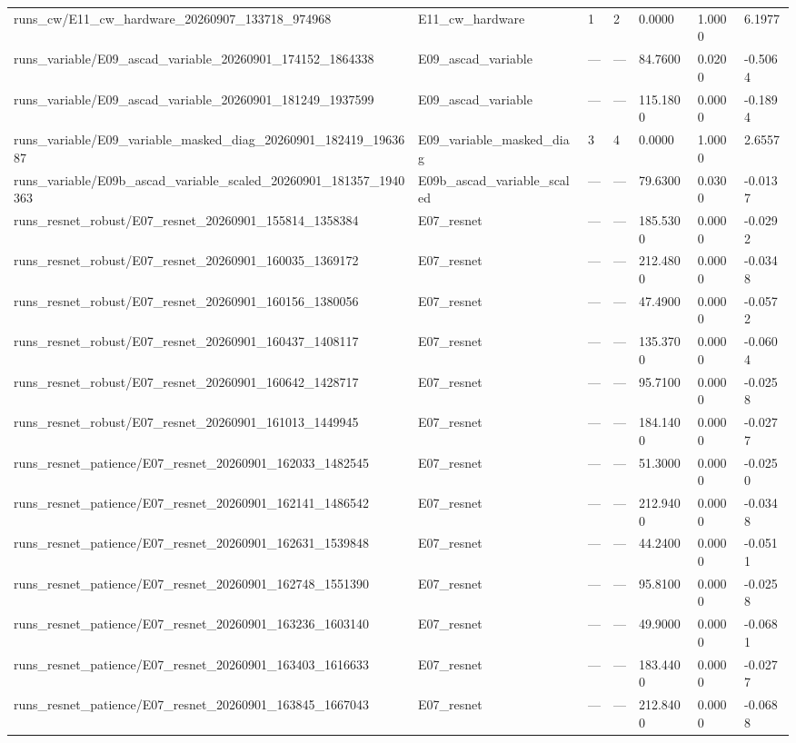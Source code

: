 \begin{tabular}{lllllll}
runs_cw/E11_cw_hardware_20260907_133718_974968 & E11_cw_hardware & 1 & 2 & 0.0000 & 1.0000 & 6.1977 \\
runs_variable/E09_ascad_variable_20260901_174152_1864338 & E09_ascad_variable & — & — & 84.7600 & 0.0200 & -0.5064 \\
runs_variable/E09_ascad_variable_20260901_181249_1937599 & E09_ascad_variable & — & — & 115.1800 & 0.0000 & -0.1894 \\
runs_variable/E09_variable_masked_diag_20260901_182419_1963687 & E09_variable_masked_diag & 3 & 4 & 0.0000 & 1.0000 & 2.6557 \\
runs_variable/E09b_ascad_variable_scaled_20260901_181357_1940363 & E09b_ascad_variable_scaled & — & — & 79.6300 & 0.0300 & -0.0137 \\
runs_resnet_robust/E07_resnet_20260901_155814_1358384 & E07_resnet & — & — & 185.5300 & 0.0000 & -0.0292 \\
runs_resnet_robust/E07_resnet_20260901_160035_1369172 & E07_resnet & — & — & 212.4800 & 0.0000 & -0.0348 \\
runs_resnet_robust/E07_resnet_20260901_160156_1380056 & E07_resnet & — & — & 47.4900 & 0.0000 & -0.0572 \\
runs_resnet_robust/E07_resnet_20260901_160437_1408117 & E07_resnet & — & — & 135.3700 & 0.0000 & -0.0604 \\
runs_resnet_robust/E07_resnet_20260901_160642_1428717 & E07_resnet & — & — & 95.7100 & 0.0000 & -0.0258 \\
runs_resnet_robust/E07_resnet_20260901_161013_1449945 & E07_resnet & — & — & 184.1400 & 0.0000 & -0.0277 \\
runs_resnet_patience/E07_resnet_20260901_162033_1482545 & E07_resnet & — & — & 51.3000 & 0.0000 & -0.0250 \\
runs_resnet_patience/E07_resnet_20260901_162141_1486542 & E07_resnet & — & — & 212.9400 & 0.0000 & -0.0348 \\
runs_resnet_patience/E07_resnet_20260901_162631_1539848 & E07_resnet & — & — & 44.2400 & 0.0000 & -0.0511 \\
runs_resnet_patience/E07_resnet_20260901_162748_1551390 & E07_resnet & — & — & 95.8100 & 0.0000 & -0.0258 \\
runs_resnet_patience/E07_resnet_20260901_163236_1603140 & E07_resnet & — & — & 49.9000 & 0.0000 & -0.0681 \\
runs_resnet_patience/E07_resnet_20260901_163403_1616633 & E07_resnet & — & — & 183.4400 & 0.0000 & -0.0277 \\
runs_resnet_patience/E07_resnet_20260901_163845_1667043 & E07_resnet & — & — & 212.8400 & 0.0000 & -0.0688 \\

\end{tabular}
